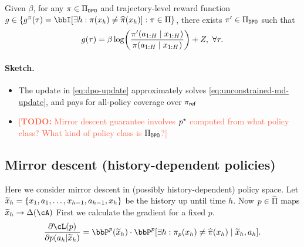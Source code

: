 \documentclass{article}
\newcommand{\todo}[1]{\textcolor{Tomato}{[\textbf{TODO:} {#1}]}}
\let\oldparagraph\paragraph
\renewcommand{\paragraph}[1]{\oldparagraph{#1.}}
\begin{document}
\begin{assumption}
  Given $\beta$, for any $\pi \in \Pi_{\texttt{DPO}}$ and trajectory-level reward function $g \in \cbr*{g^\pi(\tau) = \bbI\sbr*{\exists h : \pi(x_h) \neq \pihat(x_h)} : \pi\in\Pi}$, there exists $\pi'\in\Pi_{\texttt{DPO}}$ such that 
  \begin{align*}
    g(\tau) = \beta\log\rbr*{\frac{\pi'(a_{1:H}\mid{}x_{1:H})}{\pi(a_{1:H}\mid{}x_{1:H})}} + Z,~\forall \tau. 
  \end{align*}
\end{assumption}

\paragraph{Sketch}
\begin{itemize}
  \item The update in \cref{eq:dpo-update} approximately solves \cref{eq:unconstrained-md-update}, and pays for all-policy coverage over $\pi_\mathsf{ref}$ 
  \item \todo{Mirror descent guarantee involves $p^\star$ computed from what policy class? What kind of policy class is $\Pi_{\texttt{DPO}}$?} 
\end{itemize}

\subsection{Mirror descent (history-dependent policies)} 
Here we consider mirror descent in (possibly history-dependent) policy space. Let $\widetilde{x}_h = \{x_1,a_1,\ldots,x_{h-1},a_{h-1},x_h\}$ be the history up until time $h$. Now $p \in \widetilde\Pi$ maps $\wt{x}_h \rightarrow \Delta(\cA)$
First we calculate the gradient for a fixed $p$.  
\begin{align*}
  \frac{\partial \cL(p)}{\partial p(a_h|\wt{x}_h)}  = \bbP^p(\wt{x}_h) \cdot \bbP^p\sbr*{\exists h : \pi_p(x_h) \neq \pihat(x_h) \mid{} \wt{x}_h,a_h}. 
\end{align*}



%
\end{document}
